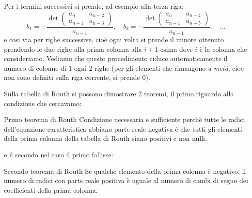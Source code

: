 \documentclass[a4paper,11pt]{article}
\begin{document}
Per i termini successivi si prende, ad esempio alla terza riga:
$$
b_1 = - \frac{ \det \begin{pmatrix}
	a_n & a_{n - 2} \\
	a_{n - 1} & a_{n - 3}
\end{pmatrix} }{a_{n - 1}}, \quad
b_2 = - \frac{ \det \begin{pmatrix}
	a_n & a_{n - 4} \\
	a_{n - 1} & a_{n - 5}
\end{pmatrix} }{a_{n - 1}}, \quad ...
$$
e cosi via per righe successive, cioè ogni volta si prende il minore ottenuto prendendo le due righe alla prima colonna  alla $i + 1$-esima dove $i$ è la colonna che consideriamo.
Vediamo che questo procedimento riduce automaticamente il numero di colonne di $1$ ogni $2$ righe (per gli elementi che rimangono \textit{a metà}, cioe non sono definiti sulla riga corrente, si prende 0).

Sulla tabella di Routh si possono dimostrare 2 teoremi, il primo riguardo alla condizione che cercavamo:
\begin{theorem}{Primo teorema di Routh}
	Condizione necessaria e sufficiente perchè tutte le radici dell'equazione caratteristica abbiano parte reale negativa è che tutti gli elementi della prima colonna della tabella di Routh siano positivi e non nulli.
\end{theorem}
e il secondo nel caso il primo fallisse:
\begin{theorem}{Secondo teorema di Routh}
	Se qualche elemento della prima colonna è negativo, il numero di radici con parte reale positiva è uguale al numero di cambi di segno dei coefficienti della prima colonna.
\end{theorem}
\end{document}
